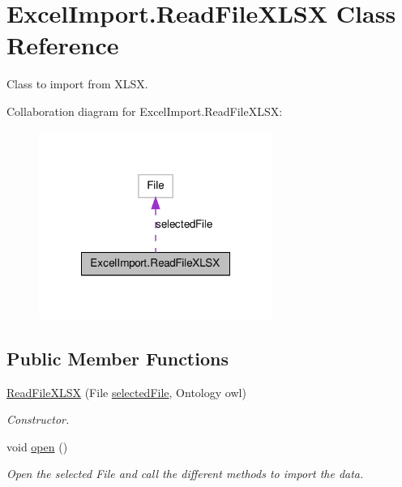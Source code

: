 \hypertarget{class_excel_import_1_1_read_file_x_l_s_x}{
\section{ExcelImport.ReadFileXLSX Class Reference}
\label{class_excel_import_1_1_read_file_x_l_s_x}
}


Class to import from XLSX.  




Collaboration diagram for ExcelImport.ReadFileXLSX:
\nopagebreak
\begin{figure}[H]
\begin{center}
\leavevmode
\includegraphics[width=216pt]{class_excel_import_1_1_read_file_x_l_s_x__coll__graph}
\end{center}
\end{figure}
\subsection*{Public Member Functions}
\begin{DoxyCompactItemize}
\item 
\hyperlink{class_excel_import_1_1_read_file_x_l_s_x_a0a81b78158e67b631c11b100a06559cb}{ReadFileXLSX} (File \hyperlink{class_excel_import_1_1_read_file_x_l_s_x_a96053b681904937c778d14c1a00024e2}{selectedFile}, Ontology owl)
\begin{DoxyCompactList}\small\item\em Constructor. \end{DoxyCompactList}\item 
\hypertarget{class_excel_import_1_1_read_file_x_l_s_x_a39b3d06a905bda09ecd63f6d4b38ce21}{
void \hyperlink{class_excel_import_1_1_read_file_x_l_s_x_a39b3d06a905bda09ecd63f6d4b38ce21}{open} ()}
\label{class_excel_import_1_1_read_file_x_l_s_x_a39b3d06a905bda09ecd63f6d4b38ce21}

\begin{DoxyCompactList}\small\item\em Open the selected File and call the different methods to import the data. \end{DoxyCompactList}\end{DoxyCompactItemize}
